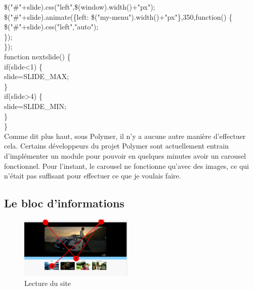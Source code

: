 \documentclass{article}
\begin{document}
{{\hspace*{0.6cm}\$("\#"+slide).css("left",\$(window).width()+"px");\\
\hspace*{0.6cm}\$("\#"+slide).animate(\{left: \$("my-menu").width()+"px"\},350,function() \{\\
\hspace*{1.2cm}\$("\#"+slide).css("left","auto");\\
\hspace*{0.6cm}\});		\\
\});\\
function nextslide() \{\\
\hspace*{0.6cm}if(slide<1) \{\\
\hspace*{1.2cm}slide=SLIDE\_MAX;\\
\hspace*{0.6cm}\} \\
\hspace*{0.6cm}if(slide>4) \{\\
\hspace*{1.2cm}slide=SLIDE\_MIN;\\
\hspace*{0.6cm}\}\\
\}
}}	
\vspace{0.5cm}\\
Comme dit plus haut, sous Polymer, il n'y a aucune autre mani\`ere d'effectuer cela. Certains d\'eveloppeurs du projet Polymer sont actuellement entrain d'impl\'ementer un module pour pouvoir en quelques minutes avoir un carousel fonctionnel. Pour l'instant, le carousel ne fonctionne qu'avec des images, ce qui n'\'etait pas suffisant pour effectuer ce que je voulais faire.

\subsection{Le bloc d'informations}

\begin{figure}
  \vspace{-25pt}
  \begin{center}
    \includegraphics[width=0.48\textwidth]{p20}
  \end{center}
  \vspace{-20pt}
  \caption{Lecture du site}
  \vspace{-10pt}
\end{figure} 
\end{document}

